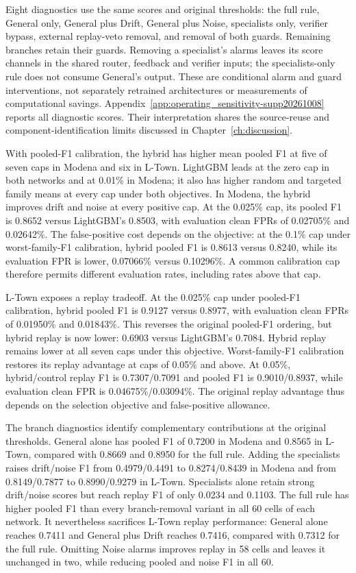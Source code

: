 Eight diagnostics use the same scores and original thresholds: the full rule, General only, General plus Drift, General plus Noise, specialists only, verifier bypass, external replay-veto removal, and removal of both guards. Remaining branches retain their guards. Removing a specialist's alarms leaves its score channels in the shared router, feedback and verifier inputs; the specialists-only rule does not consume General's output. These are conditional alarm and guard interventions, not separately retrained architectures or measurements of computational savings. Appendix~\ref{app:operating_sensitivity-supp20261008} reports all diagnostic scores. Their interpretation shares the source-reuse and component-identification limits discussed in Chapter~\ref{ch:discussion}.

With pooled-F1 calibration, the hybrid has higher mean pooled F1 at five of seven caps in Modena and six in L-Town. LightGBM leads at the zero cap in both networks and at 0.01\% in Modena; it also has higher random and targeted family means at every cap under both objectives. In Modena, the hybrid improves drift and noise at every positive cap. At the 0.025\% cap, its pooled F1 is 0.8652 versus LightGBM's 0.8503, with evaluation clean FPRs of 0.02705\% and 0.02642\%. The false-positive cost depends on the objective: at the 0.1\% cap under worst-family-F1 calibration, hybrid pooled F1 is 0.8613 versus 0.8240, while its evaluation FPR is lower, 0.07066\% versus 0.10296\%. A common calibration cap therefore permits different evaluation rates, including rates above that cap.

L-Town exposes a replay tradeoff. At the 0.025\% cap under pooled-F1 calibration, hybrid pooled F1 is 0.9127 versus 0.8977, with evaluation clean FPRs of 0.01950\% and 0.01843\%. This reverses the original pooled-F1 ordering, but hybrid replay is now lower: 0.6903 versus LightGBM's 0.7084. Hybrid replay remains lower at all seven caps under this objective. Worst-family-F1 calibration restores its replay advantage at caps of 0.05\% and above. At 0.05\%, hybrid/control replay F1 is 0.7307/0.7091 and pooled F1 is 0.9010/0.8937, while evaluation clean FPR is 0.04675\%/0.03094\%. The original replay advantage thus depends on the selection objective and false-positive allowance.

The branch diagnostics identify complementary contributions at the original thresholds. General alone has pooled F1 of 0.7200 in Modena and 0.8565 in L-Town, compared with 0.8669 and 0.8950 for the full rule. Adding the specialists raises drift/noise F1 from 0.4979/0.4491 to 0.8274/0.8439 in Modena and from 0.8149/0.7877 to 0.8990/0.9279 in L-Town. Specialists alone retain strong drift/noise scores but reach replay F1 of only 0.0234 and 0.1103. The full rule has higher pooled F1 than every branch-removal variant in all 60 cells of each network. It nevertheless sacrifices L-Town replay performance: General alone reaches 0.7411 and General plus Drift reaches 0.7416, compared with 0.7312 for the full rule. Omitting Noise alarms improves replay in 58 cells and leaves it unchanged in two, while reducing pooled and noise F1 in all 60.

